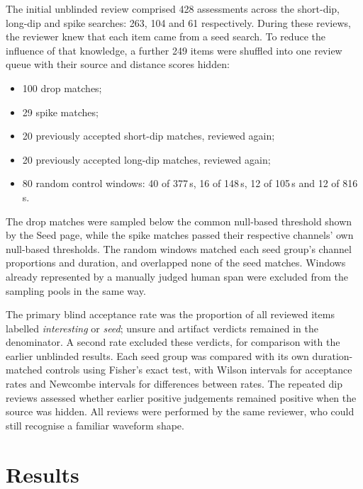 The initial unblinded review comprised 428 assessments across the short-dip, long-dip and spike searches: 263, 104 and 61 respectively. During these reviews, the reviewer knew that each item came from a seed search. To reduce the influence of that knowledge, a further 249 items were shuffled into one review queue with their source and distance scores hidden:
\begin{itemize}
  \item 100 drop matches;
  \item 29 spike matches;
  \item 20 previously accepted short-dip matches, reviewed again;
  \item 20 previously accepted long-dip matches, reviewed again;
  \item 80 random control windows: 40 of 377\,s, 16 of 148\,s, 12 of 105\,s and 12 of 816\,s.
\end{itemize}
The drop matches were sampled below the common null-based threshold shown by the Seed page, while the spike matches passed their respective channels' own null-based thresholds. The random windows matched each seed group's channel proportions and duration, and overlapped none of the seed matches. Windows already represented by a manually judged human span were excluded from the sampling pools in the same way.

The primary blind acceptance rate was the proportion of all reviewed items labelled \emph{interesting} or \emph{seed}; unsure and artifact verdicts remained in the denominator. A second rate excluded these verdicts, for comparison with the earlier unblinded results. Each seed group was compared with its own duration-matched controls using Fisher's exact test, with Wilson intervals for acceptance rates and Newcombe intervals for differences between rates. The repeated dip reviews assessed whether earlier positive judgements remained positive when the source was hidden. All reviews were performed by the same reviewer, who could still recognise a familiar waveform shape.


\section{Results}

